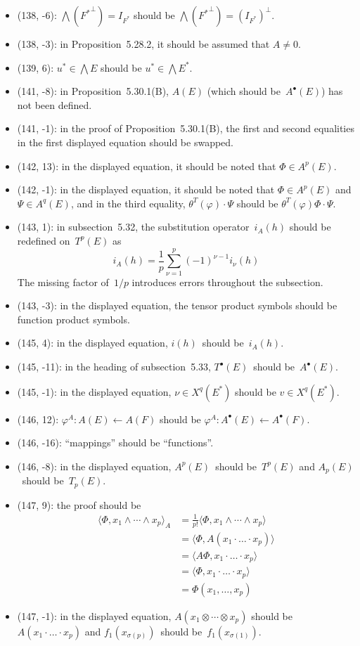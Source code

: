 \documentclass[letterpaper,12pt]{article}
\newcommand{\from}{\leftarrow}
\newcommand{\tprod}{\otimes}
\newcommand{\eprod}{\wedge}
\newcommand{\bigeprod}{\bigwedge}
\newcommand{\sprod}[2]{\langle#1,#2\rangle}
\newcommand{\oc}[1]{#1^{\perp}}
\begin{document}
\begin{itemize}
\item (138, -6): \(\bigeprod(\oc{{F^*}})=I_{F^*}\) should be \(\bigeprod(\oc{{F^*}})=\oc{(I_{F^*})}\).
\item (138, -3): in Proposition~5.28.2, it should be assumed that \(A\ne 0\).
\item (139, 6): \(u^*\in\bigeprod E\) should be \(u^*\in\bigeprod E^*\).
\item (141, -8): in Proposition~5.30.1(B), \(A(E)\) (which should be~\(A^{\bullet}(E)\)) has not been defined.
\item (141, -1): in the proof of Proposition~5.30.1(B), the first and second equalities in the first displayed equation should be swapped.
\item (142, 13): in the displayed equation, it should be noted that \(\Phi\in A^p(E)\).
\item (142, -1): in the displayed equation, it should be noted that \(\Phi\in A^p(E)\) and \(\Psi\in A^q(E)\), and in the third equality, \(\theta^T(\varphi)\cdot\Psi\) should be \(\theta^T(\varphi)\Phi\cdot\Psi\).
\item (143, 1): in subsection~5.32, the substitution operator~\(i_A(h)\) should be redefined on~\(T^p(E)\) as
\[i_A(h)=\frac{1}{p}\sum_{\nu=1}^p(-1)^{\nu-1}i_{\nu}(h)\]
The missing factor of~\(1/p\) introduces errors throughout the subsection.
\item (143, -3): in the displayed equation, the tensor product symbols should be function product symbols.
\item (145, 4): in the displayed equation, \(i(h)\)~should be~\(i_A(h)\).
\item (145, -11): in the heading of subsection~5.33, \(T^{\bullet}(E)\)~should be~\(A^{\bullet}(E)\).
\item (145, -1): in the displayed equation, \(\nu\in X^q(E^*)\) should be \(v\in X^q(E^*)\).
\item (146, 12): \(\varphi^A:A(E)\from A(F)\) should be \(\varphi^A:A^{\bullet}(E)\from A^{\bullet}(F)\).
\item (146, -16): ``mappings'' should be ``functions''.
\item (146, -8): in the displayed equation, \(A^p(E)\)~should be~\(T^p(E)\) and \(A_p(E)\)~should be~\(T_p(E)\).
\item (147, 9): the proof should be
\begin{align*}
\sprod{\Phi}{x_1\eprod\cdots\eprod x_p}_A&=\frac{1}{p!}\sprod{\Phi}{x_1\eprod\cdots\eprod x_p}\\
	&=\sprod{\Phi}{A(x_1\cdot\ldots\cdot x_p)}\\
	&=\sprod{A\Phi}{x_1\cdot\ldots\cdot x_p}\\
	&=\sprod{\Phi}{x_1\cdot\ldots\cdot x_p}\\
	&=\Phi(x_1,\ldots,x_p)
\end{align*}
\item (147, -1): in the displayed equation, \(A(x_1\tprod\cdots\tprod x_p)\) should be \(A(x_1\cdot\ldots\cdot x_p)\) and \(f_1(x_{\sigma(p)})\)~should be~\(f_1(x_{\sigma(1)})\).
\end{itemize}
\end{document}
